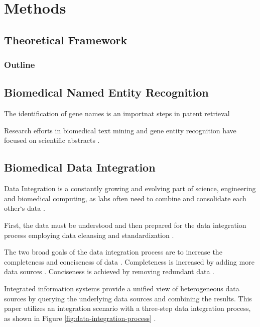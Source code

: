 \part{Methods}

\chapter{Theoretical Framework}
\label{cha:theory}

\section{Outline}

\chapter{Biomedical Named Entity Recognition}

The identification of gene names is an importnat steps in patent retrieval

Research efforts in biomedical text mining and gene entity recognition have focused on scientific abstracts \cite{RodriguezEsteban2016TextMP}.

\chapter{Biomedical Data Integration}

Data Integration is a constantly growing and evolving part of science, engineering and biomedical computing, as labs often need to combine and consolidate each other`s data \cite{Bernstein2008InformationII}.

First, the data must be understood and then prepared for the data integration process employing data cleansing and standardization \cite{Bernstein2008InformationII}.

The two broad goals of the data integration process are to increase the completeness and conciseness of data \cite{Bleiholder2009DataF}.
Completeness is increased by adding more data sources \cite{Bleiholder2009DataF}.
Conciseness is achieved by removing redundant data \cite{Bleiholder2009DataF}.

Integrated information systems provide a unified view of heterogeneous data sources by querying the underlying data sources and combining the results. This paper utilizes an integration scenario with a three-step data integration process, as shown in Figure \ref{fig:data-integration-process} \cite{Bleiholder2009DataF}.

